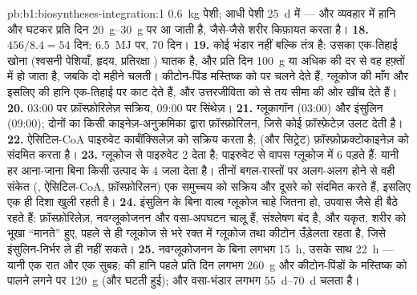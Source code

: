 \begin{solution}{pb:b1:biosyntheses-integration:1}
\qty{0.6}{kg} पेशी; आधी पेशी \qty{25}{d} में --- और व्यवहार में
हानि और घटकर प्रति दिन \qtyrange{20}{30}{g} पर आ जाती है, जैसे-जैसे शरीर
किफ़ायत करता है।
\textbf{18.} $456/8.4 = 54$ दिन; \qty{6.5}{MJ} पर, 70 दिन।
\textbf{19.}  कोई भंडार नहीं बल्कि तंत्र है: उसका एक-तिहाई खोना
(श्वसनी पेशियाँ, हृदय, प्रतिरक्षा ) घातक है, और प्रति दिन
\qty{100}{g} या अधिक की दर से वह हफ़्तों में हो जाता है, जबकि 
दो महीने चलती। कीटोन-पिंड मस्तिष्क को  पर चलने देते हैं, ग्लूकोज की
माँग और इसलिए  की हानि एक-तिहाई पर काट देते हैं, और उत्तरजीविता को
 से तय सीमा की ओर खींच देते हैं।
\textbf{20.} 03:00 पर  फ़ॉस्फ़ोरिलेज़ सक्रिय, 09:00 पर
 सिंथेज़।
\textbf{21.} ग्लूकागॉन (03:00) और इंसुलिन (09:00); दोनों  का
किसी काइनेज़-अनुक्रमिका द्वारा फ़ॉस्फ़ोरिलन, जिसे कोई फ़ॉस्फ़ेटेज़ उलट देती है।
\textbf{22.} ऐसिटिल-CoA पाइरुवेट कार्बॉक्सिलेज़ को सक्रिय करता है; 
(और सिट्रेट) फ़ॉस्फ़ोफ्रक्टोकाइनेज़ को संदमित करता है।
\textbf{23.} ग्लूकोज से पाइरुवेट 2  देता है; पाइरुवेट से वापस
ग्लूकोज में 6 पड़ते हैं: यानी हर आना-जाना बिना किसी उत्पाद के 4  जला
देता है। तीनों बगल-रास्तों पर अलग-अलग  होने से वही संकेत (,
ऐसिटिल-CoA, फ़ॉस्फ़ोरिलन) एक समुच्चय को सक्रिय और दूसरे को संदमित करते
हैं, इसलिए एक ही दिशा खुली रहती है।
\textbf{24.} इंसुलिन के बिना वाल्व ग्लूकोज चाहे जितना हो, उपवास जैसे ही
बैठे रहते हैं: फ़ॉस्फ़ोरिलेज़, नवग्लूकोजनन और वसा-अपघटन चालू हैं,
संश्लेषण बंद है, और यकृत, शरीर को भूखा ``मानते'' हुए, पहले से ही ग्लूकोज
से भरे रक्त में ग्लूकोज तथा कीटोन उँड़ेलता रहता है, जिसे इंसुलिन-निर्भर
 ले ही नहीं सकते।
\textbf{25.} नवग्लूकोजनन के बिना लगभग \qty{15}{h}, उसके साथ \qty{22}{h}
--- यानी एक रात और एक सुबह;  की हानि पहले प्रति दिन लगभग
\qty{260}{g} और कीटोन-पिंडों के मस्तिष्क को पालने लगने पर \qty{120}{g}
(और घटती हुई); और वसा-भंडार लगभग \qtyrange{55}{70}{d} चलता है।
\end{solution}
